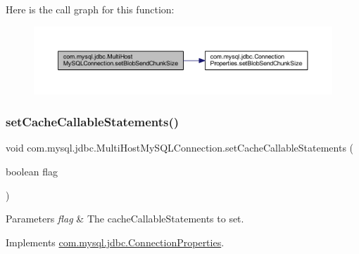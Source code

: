 Here is the call graph for this function\+:
\nopagebreak
\begin{figure}[H]
\begin{center}
\leavevmode
\includegraphics[width=350pt]{classcom_1_1mysql_1_1jdbc_1_1_multi_host_my_s_q_l_connection_a8ab368d3783dcf159d7b5055fa104362_cgraph}
\end{center}
\end{figure}
\mbox{\label{classcom_1_1mysql_1_1jdbc_1_1_multi_host_my_s_q_l_connection_a2d8108c12a82b35523797323427b3b45}} 
\subsubsection{\texorpdfstring{set\+Cache\+Callable\+Statements()}{setCacheCallableStatements()}}
{\footnotesize\ttfamily void com.\+mysql.\+jdbc.\+Multi\+Host\+My\+S\+Q\+L\+Connection.\+set\+Cache\+Callable\+Statements (\begin{DoxyParamCaption}\item[{boolean}]{flag }\end{DoxyParamCaption})}


\begin{DoxyParams}{Parameters}
{\em flag} & The cache\+Callable\+Statements to set. \\
\hline
\end{DoxyParams}


Implements \mbox{\hyperlink{interfacecom_1_1mysql_1_1jdbc_1_1_connection_properties_ae88f31bc280f1a82f70847797a0a25e7}{com.\+mysql.\+jdbc.\+Connection\+Properties}}.

